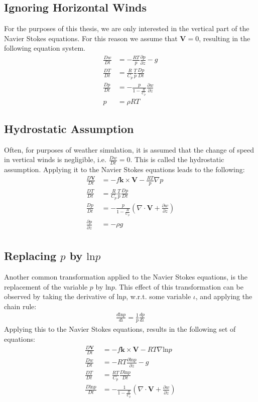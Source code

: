 \subsection{Ignoring Horizontal Winds}
For the purposes of this thesis, we are only interested in the vertical part of the Navier Stokes equations.
For this reason we assume that $\textbf{V}=0$, resulting in the following equation system.
\begin{align*}
\frac{Dw}{Dt} &= - \frac{RT}{p} \frac{\partial p}{\partial z} - g \\
\frac{DT}{Dt} &= \frac{R}{C_p}\frac{T}{p}\frac{Dp}{Dt}\\
\frac{Dp}{Dt} &= -\frac{p}{1- \frac{R}{C_p}} \frac{\partial w}{\partial z}\\
p &= \rho R T
\end{align*}

\subsection{Hydrostatic Assumption}\label{subsec_hydrostat}
Often, for purposes of weather simulation, it is assumed that the change of speed in vertical winds is negligible, i.e. $\frac{Dw}{Dt}=0$.
This is called the hydrostatic assumption.
Applying it to the Navier Stokes equations leads to the following:
\begin{align*}
\frac{D\textbf{V}}{Dt} &= -f\boldsymbol{k} \times \textbf{V} - \frac{RT}{p}\nabla p\\
\frac{DT}{Dt} &= \frac{R}{C_p}\frac{T}{p}\frac{Dp}{Dt}\\
\frac{Dp}{Dt} &= -\frac{p}{1- \frac{R}{C_p}} (\nabla \cdot \textbf{V} + \frac{\partial w}{\partial z})\\
\frac{\partial p}{\partial z} &= -\rho g \\
\end{align*}

\subsection{Replacing $p$ by $\text{ln}p$}
Another common transformation applied to the Navier Stokes equations, is the replacement of the variable $p$ by $\text{ln}p$.
This effect of this transformation can be observed by taking the derivative of $\text{ln}p$, w.r.t. some variable $\iota$, and applying the chain rule:
\begin{align*}
\frac{d\text{ln}p}{d\iota} =  \frac{1}{p}\frac{dp}{d\iota}
\end{align*}
Applying this to the Navier Stokes equations, results in the following set of equations:
\begin{align*}
\frac{D\textbf{V}}{Dt} &= -f\boldsymbol{k} \times \textbf{V} - RT\nabla \text{ln}p\\
\frac{Dw}{Dt} &= - RT \frac{\partial \text{ln}p}{\partial z} - g \\
\frac{DT}{Dt} &= \frac{RT}{C_p}\frac{D\text{ln}p}{Dt}\\
\frac{D\text{ln}p}{Dt} &= -\frac{1}{1- \frac{R}{C_p}} (\nabla \cdot \textbf{V} + \frac{\partial w}{\partial z})
\end{align*}

